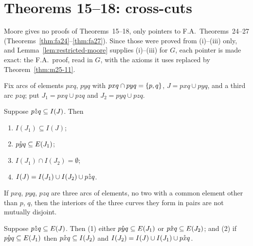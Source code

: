 
\section{Theorems 15--18: cross-cuts}

Moore gives no proofs of Theorems~15--18, only pointers to F.A.\ Theorems~24--27
(Theorems~\ref{thm:fa24}--\ref{thm:fa27}). Since those were proved from (i)--(iii) only, and
Lemma~\ref{lem:restricted-moore} supplies (i)--(iii) for $G$, each pointer is made exact: the F.A.\ proof, read in
$G$, with the axioms it uses replaced by Theorem~\ref{thm:m25-11}.

Fix arcs of elements $pxq$, $pyq$ with $pxq\cap pyq=\left\{ p,q \right\}$, $J=pxq\cup pyq$, and a third arc $pzq$; put
$J_1=pxq\cup pzq$ and $J_2=pyq\cup pzq$.

\begin{theorem}\label{thm:m25-15-16}
Suppose $\mathring{pzq}\subseteq I(J)$. Then
\begin{enumerate}[label=(\arabic*)]
\item $I(J_1)\subseteq I(J)$;
\item $\mathring{pyq}\subseteq E(J_1)$;
\item $I(J_1)\cap I(J_2)=\emptyset$;
\item $I(J)=I(J_1)\cup I(J_2)\cup\mathring{pzq}$.
\end{enumerate}
\end{theorem}


\begin{theorem}\label{thm:m25-17}
If $pxq$, $pyq$, $pzq$ are three arcs of elements, no two with a common element other than $p$, $q$, then the
interiors of the three curves they form in pairs are not mutually disjoint.
\end{theorem}


\begin{theorem}\label{thm:m25-18}
Suppose $\mathring{pzq}\subseteq E(J)$. Then (1) either $\mathring{pyq}\subseteq E(J_1)$ or $\mathring{pxq}\subseteq E(J_2)$; and
(2) if $\mathring{pyq}\subseteq E(J_1)$ then $\mathring{pxq}\subseteq I(J_2)$ and $I(J_2)=I(J)\cup I(J_1)\cup\mathring{pxq}$.
\end{theorem}


